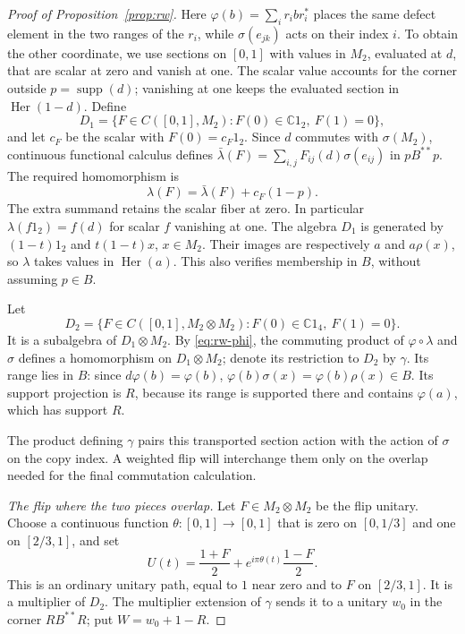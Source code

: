 \begin{proof}[Proof of Proposition~\ref{prop:rw}]
Here $\varphi(b)=\sum_i r_i b r_i^*$ places the same defect element in
the two ranges of the $r_i$, while $\sigma(e_{jk})$ acts on their index
$i$. To obtain the other coordinate, we use sections on $[0,1]$ with values
in $M_2$, evaluated at $d$, that are scalar at zero and vanish at one.
The scalar value accounts for the corner outside $p=\operatorname{supp}(d)$;
vanishing at one keeps the evaluated section in $\operatorname{Her}(1-d)$.
Define
\[
 D_1=\{F\in C([0,1],M_2):F(0)\in\mathbb C1_2,\ F(1)=0\},
\]
and let $c_F$ be the scalar with $F(0)=c_F1_2$. Since $d$ commutes
with $\sigma(M_2)$, continuous functional calculus defines
$\bar\lambda(F)=\sum_{i,j}F_{ij}(d)\sigma(e_{ij})$ in $pB^{**}p$.
The required homomorphism is
\begin{equation}\label{eq:rw-lambda}
 \lambda(F)=\bar\lambda(F)+c_F(1-p).
\end{equation}
The extra summand retains the scalar fiber at zero. In particular
$\lambda(f1_2)=f(d)$ for scalar $f$ vanishing at one.
The algebra $D_1$ is generated by $(1-t)1_2$ and
$t(1-t)x$, $x\in M_2$. Their images are respectively $a$ and
$a\rho(x)$, so $\lambda$ takes values in $\operatorname{Her}(a)$.
This also verifies membership in $B$, without assuming $p\in B$.

Let
\[
 D_2=\{F\in C([0,1],M_2\otimes M_2):
                   F(0)\in\mathbb C1_4,\ F(1)=0\}.
\]
It is a subalgebra of $D_1\otimes M_2$. By
\eqref{eq:rw-phi}, the commuting product of
$\varphi\circ\lambda$ and $\sigma$ defines a homomorphism on
$D_1\otimes M_2$; denote its restriction to $D_2$ by $\gamma$.
Its range lies in $B$: since $d\varphi(b)=\varphi(b)$,
$\varphi(b)\sigma(x)=\varphi(b)\rho(x)\in B$.
Its support projection is $R$, because its range is supported there
and contains $\varphi(a)$, which has support $R$.

The product defining $\gamma$ pairs this transported section action with
the action of $\sigma$ on the copy index. A weighted flip will interchange
them only on the overlap needed for the final commutation calculation.

\emph{The flip where the two pieces overlap.}
Let $F\in M_2\otimes M_2$ be the flip unitary. Choose a continuous
function $\theta:[0,1]\to[0,1]$ that is zero on $[0,1/3]$ and one
on $[2/3,1]$, and set
\[
 U(t)=\frac{1+F}{2}+e^{i\pi\theta(t)}\frac{1-F}{2}.
\]
This is an ordinary unitary path, equal to $1$ near zero and to
$F$ on $[2/3,1]$. It is a multiplier of $D_2$. The multiplier
extension of $\gamma$ sends it to a unitary $w_0$ in the corner
$RB^{**}R$; put $W=w_0+1-R$.


\end{proof}
